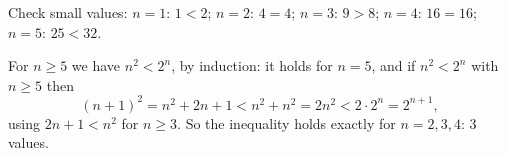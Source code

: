 Check small values: $n=1$: $1<2$; $n=2$: $4=4$; $n=3$: $9>8$; $n=4$: $16=16$; $n=5$: $25<32$.

For $n\ge5$ we have $n^2<2^n$, by induction: it holds for $n=5$, and if $n^2<2^n$ with $n\ge5$ then
\[
(n+1)^2=n^2+2n+1<n^2+n^2=2n^2<2\cdot2^n=2^{n+1},
\]
using $2n+1<n^2$ for $n\ge3$. So the inequality holds exactly for $n=2,3,4$: $\boxed{3}$ values.
